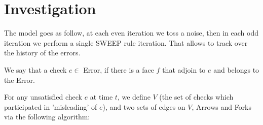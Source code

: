 \section{Investigation}

The model goes as follow, at each even iteration we toss a noise, then in each odd iteration we perform a single SWEEP rule iteration. That allows to track over the history of the errors.  

We say that a check $e \in $ Error, if there is a face $f$ that adjoin to $e$ and belongs to the Error. 


\begin{definition}[Investigation]
  For any unsatisfied check $e$ at time $t$, we define $V$ (the set of checks which participated in 'misleading' of $e$), and two sets of edges on $V$, Arrows and Forks via the following algorithm: 


  

\end{definition}


